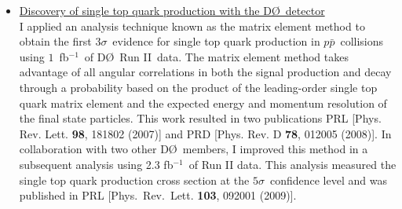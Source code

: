\documentclass[12pt]{article}
\newcommand{\dzero}{D\O}
\begin{document}
\begin{singlespace}
\begin{itemize}
\item{\underline{Discovery of single top quark production with the \dzero~detector}\\I applied an analysis technique known as the matrix element method to obtain the first $3\sigma$~evidence for single top quark production in $p\bar{p}$~collisions using $1$~fb$^{-1}$~of \dzero~Run II~data. The matrix element method takes advantage of all angular correlations in both the signal production and decay through a probability based on the product of the leading-order single top quark matrix element and the expected energy and momentum resolution of the final state particles. This work resulted in two publications PRL [Phys. Rev. Lett. {\bf 98}, 181802 (2007)] and PRD [Phys. Rev. D {\bf 78}, 012005 (2008)]. In collaboration with two other \dzero~members, I improved this method in a subsequent analysis using 2.3 fb$^{-1}$~of Run II data. This analysis measured the single top quark production cross section at the $5\sigma$~confidence level and was published in PRL [Phys.\ Rev.\ Lett. {\bf 103}, 092001 (2009)].}
%

\end{itemize}


\end{singlespace}
\end{document}
